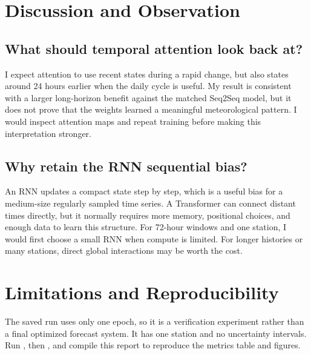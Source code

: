 \documentclass[11pt,a4paper]{article}
\begin{document}
\section{Discussion and Observation}
\subsection*{What should temporal attention look back at?}
I expect attention to use recent states during a rapid change, but also states around 24 hours earlier when the daily cycle is useful. My result is consistent with a larger long-horizon benefit against the matched Seq2Seq model, but it does not prove that the weights learned a meaningful meteorological pattern. I would inspect attention maps and repeat training before making this interpretation stronger.

\subsection*{Why retain the RNN sequential bias?}
An RNN updates a compact state step by step, which is a useful bias for a medium-size regularly sampled time series. A Transformer can connect distant times directly, but it normally requires more memory, positional choices, and enough data to learn this structure. For 72-hour windows and one station, I would first choose a small RNN when compute is limited. For longer histories or many stations, direct global interactions may be worth the cost.

\section{Limitations and Reproducibility}
The saved run uses only one epoch, so it is a verification experiment rather than a final optimized forecast system. It has one station and no uncertainty intervals. Run , then , and compile this report to reproduce the metrics table and figures.
\end{document}
